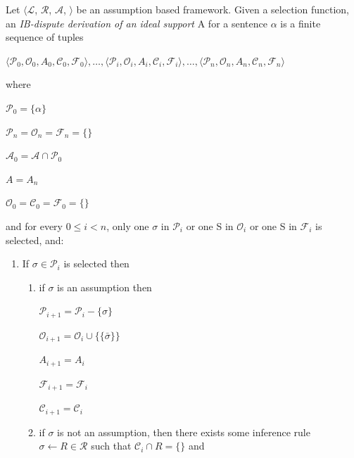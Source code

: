 \begin{defn} \label{def_fail} Let $\langle\mathcal{L}$, $\mathcal{R}$, $\mathcal{A}$, {\bf\textasciimacron} $\rangle$ be an assumption based framework. Given a selection function, an \emph{IB-dispute derivation of an ideal support} A for a sentence $\alpha$ is a finite sequence of tuples
\newline

$\langle\mathcal{P}_0, \mathcal{O}_0, A_0, \mathcal{C}_0, \mathcal{F}_0 \rangle,\ldots, \langle\mathcal{P}_i, \mathcal{O}_i, A_i, \mathcal{C}_i, \mathcal{F}_i \rangle, \ldots, \langle\mathcal{P}_n, \mathcal{O}_n, A_n, \mathcal{C}_n, \mathcal{F}_n \rangle$

where

\begin{multicols}{3}
$\mathcal{P}_0=\{\alpha\}$

$\mathcal{P}_n=\mathcal{O}_n=\mathcal{F}_n=\{\}$

\columnbreak

$\mathcal{A}_0=\mathcal{A} \cap \mathcal{P}_0$

$A=A_n$

\columnbreak

$\mathcal{O}_0=\mathcal{C}_0=\mathcal{F}_0=\{\}$

\end{multicols}

and for every $0 \leq i < n$, only one $\sigma$ in $\mathcal{P}_i$ or one S in $\mathcal{O}_i$ or one S in $\mathcal{F}_i$ is selected, and:
\\
\begin{enumerate}
\item If $\sigma \in \mathcal{P}_i$ is selected then
\begin{enumerate}
\item if $\sigma$ is an assumption then

\begin{multicols}{3}
$\mathcal{P}_{i+1}=\mathcal{P}_i - \{\sigma\}$

$\mathcal{O}_{i+1}=\mathcal{O}_i \cup \{\{\bar{\sigma}\}\}$

\columnbreak

$A_{i+1}=A_i$

$\mathcal{F}_{i+1}=\mathcal{F}_i$

\columnbreak

$\mathcal{C}_{i+1}=\mathcal{C}_i$

\end{multicols}
\item if $\sigma$ is not an assumption, then there exists some inference rule $\sigma \leftarrow R \in \mathcal{R}$ such that $\mathcal{C}_i \cap R=\{\}$ and


\end{enumerate}
\end{enumerate}
\end{defn}

